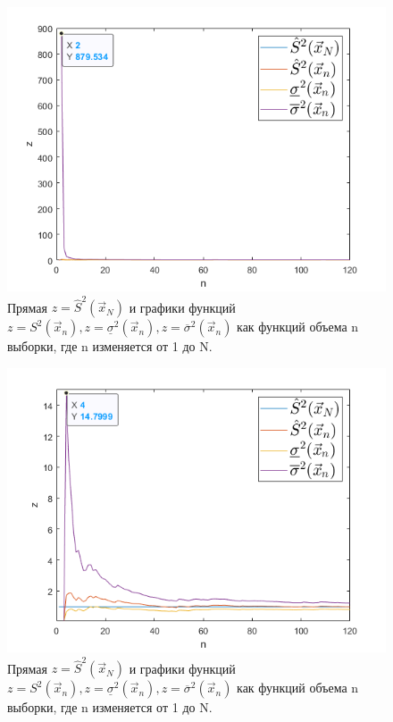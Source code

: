 \documentclass[a4paper,oneside,12pt]{extreport}
\theoremstyle{indented}
\begin{document}
\begin{enumerate}
\begin{figure}[H]
\begin{center}
\includegraphics[scale=1]{inc/img/outputGraph2.png}
\captionsetup{justification=centering}
	\caption{Прямая $z=\hat S^2 (\vec x_N)$ и графики функций $z= S^2 (\vec x_n), z= \underline \sigma^2 (\vec x_n), z =\overline \sigma^2 (\vec x_n)$ как функций объема n выборки, где n изменяется от 1 до N.}
	\label{img:outputGraph2}	
\end{center}
\end{figure}

\begin{figure}[H]
\begin{center}
\includegraphics[scale=1]{inc/img/outputGraph3.png}
\captionsetup{justification=centering}
	\caption{Прямая $z=\hat S^2 (\vec x_N)$ и графики функций $z= S^2 (\vec x_n), z= \underline \sigma^2 (\vec x_n), z =\overline \sigma^2 (\vec x_n)$ как функций объема n выборки, где n изменяется от 1 до N.}
	\label{img:outputGraph3}	
\end{center}
\end{figure}


\end{enumerate}
\end{document}
